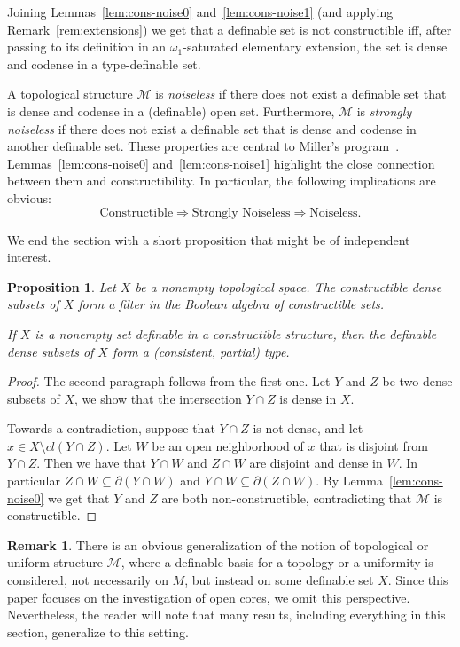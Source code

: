\documentclass[12pt]{article}
\newcommand{\Mm}{\mathcal{M}}
\newtheorem{proposition}[theorem]{Proposition}
\theoremstyle{definition}
\newtheorem{remark}[theorem]{Remark}
\theoremstyle{remark}
\begin{document}
Joining Lemmas~\ref{lem:cons-noise0} and~\ref{lem:cons-noise1} (and applying Remark~\ref{rem:extensions}) we get that a definable set is not constructible iff, after passing to its definition in an $\omega_1$-saturated elementary extension, the set is dense and codense in a type-definable set. 

A topological structure $\Mm$ is \emph{noiseless} if there does not exist a definable set that is dense and codense in a (definable) open set. Furthermore, $\Mm$ is \emph{strongly noiseless} if there does not exist a definable set that is dense and codense in another definable set. These properties are central to Miller's program~\cite{miller05-tame}. Lemmas~\ref{lem:cons-noise0} and~\ref{lem:cons-noise1} highlight the close connection between them and constructibility. In particular, the following implications are obvious:
\[
\text{Constructible} \Rightarrow \text{Strongly Noiseless} \Rightarrow \text{Noiseless}.
\]

We end the section with a short proposition that might be of independent interest.

\begin{proposition}\label{dense-filter}
Let $X$ be a nonempty topological space. The constructible dense subsets of $X$ form a filter in the Boolean algebra of constructible sets. 

If $X$ is a nonempty set definable in a constructible structure, then the definable dense subsets of $X$ form a (consistent, partial) type. 
\end{proposition}
\begin{proof}
The second paragraph follows from the first one. Let $Y$ and $Z$ be two dense subsets of $X$, we show that the intersection $Y\cap Z$ is dense in $X$. 

Towards a contradiction, suppose that $Y\cap Z$ is not dense, and let $x\in X\setminus cl(Y\cap Z)$. Let $W$ be an open neighborhood of $x$ that is disjoint from $Y\cap Z$. Then we have that $Y\cap W$ and $Z\cap W$ are disjoint and dense in $W$. In particular $Z\cap W\subseteq \partial (Y\cap W)$ and $Y\cap W\subseteq \partial (Z\cap W)$. By Lemma~\ref{lem:cons-noise0} we get that $Y$ and $Z$ are both non-constructible, contradicting that $\Mm$ is constructible. 
\end{proof} 

\begin{remark}
There is an obvious generalization of the notion of topological or uniform structure $\Mm$, where a definable basis for a topology or a uniformity is considered, not necessarily on $M$, but instead on some definable set $X$. Since this paper focuses on the investigation of open cores, we omit this perspective. Nevertheless, the reader will note that many results, including everything in this section, generalize to this setting.    
\end{remark}
\end{document}
